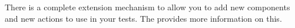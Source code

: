 There is a complete extension mechanism to allow you to add new components and new actions to use in your tests. The  provides more information on this. 

